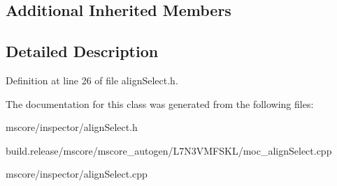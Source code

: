 \subsection*{Additional Inherited Members}


\subsection{Detailed Description}


Definition at line 26 of file align\+Select.\+h.



The documentation for this class was generated from the following files\+:\begin{DoxyCompactItemize}
\item 
mscore/inspector/align\+Select.\+h\item 
build.\+release/mscore/mscore\+\_\+autogen/\+L7\+N3\+V\+M\+F\+S\+K\+L/moc\+\_\+align\+Select.\+cpp\item 
mscore/inspector/align\+Select.\+cpp\end{DoxyCompactItemize}
